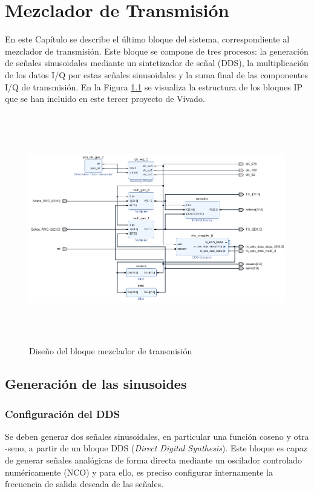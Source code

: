 \chapter{Mezclador de Transmisión}
\label{section:mezcla}

En este Capítulo se describe el último bloque del sistema, correspondiente al mezclador de transmisión. Este bloque se compone de tres procesos: la generación de señales sinusoidales mediante un sintetizador de señal (DDS), la multiplicación de los datos I/Q por estas señales sinusoidales y la suma final de las componentes I/Q de transmisión. En la Figura \ref{fig:mezclador} se visualiza la estructura de los bloques IP que se han incluido en este tercer proyecto de Vivado.

\begin{figure}[h]
    \centering
    \includegraphics[width=1.05\textwidth, height=10cm]{img/diseno/mezclador.PNG}
    \caption{Diseño del bloque mezclador de transmisión}
    \label{fig:mezclador}
\end{figure}

\pagebreak

\section{Generación de las sinusoides}

\subsection{Configuración del DDS}

Se deben generar dos señales sinusoidales, en particular una función coseno y otra -seno, a partir de un bloque DDS (\textit{Direct Digital Synthesis}). Este bloque es capaz de generar señales analógicas de forma directa mediante un oscilador controlado numéricamente (NCO) y para ello, es preciso configurar internamente la frecuencia de salida deseada de las señales. 

